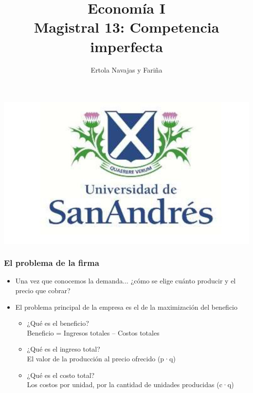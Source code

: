 \documentclass{beamer}
\title[Economía I]{Economía I \vspace{4mm}
\\ Magistral 13: Competencia imperfecta}
\date{}
\author[Ertola Navajas y Fariña]{Ertola Navajas y Fariña}
\institute[]{Universidad de San Andrés}
\begin{document}
\begin{frame}
\titlepage
\centering
\includegraphics[scale=0.2]{Slides Principios de Economia/Figures/logoUDESA.jpg} 
\end{frame}


\begin{frame}
\frametitle{El problema de la firma}
\begin{itemize}
    \item Una vez que conocemos la demanda... ¿cómo se elige cuánto producir y el precio que cobrar?
    \vspace{2mm}
    \item El problema principal de la empresa es el de la maximización del beneficio
    \vspace{2mm}     \begin{itemize}
        \item ¿Qué es el beneficio? \vspace{2mm} \\ 
        Beneficio = Ingresos totales – Costos totales
        \vspace{2mm}
        \item ¿Qué es el ingreso total? 
        \vspace{2mm} \\ 
        El valor de la producción al precio ofrecido (p·q)
        \vspace{2mm}
        \item ¿Qué es el costo total?
        \vspace{2mm} \\ 
        Los costos por unidad, por la cantidad de unidades producidas (c·q)
    \end{itemize} 
\end{itemize} 
\end{frame}
\end{document}

